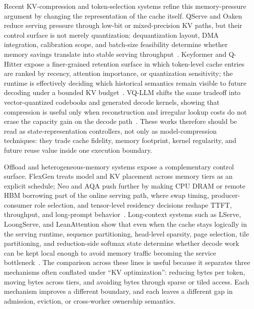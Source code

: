 \documentclass[acmsmall,screen,review]{acmart}
\begin{document}
Recent KV-compression and token-selection systems refine this memory-pressure argument by changing the representation of the cache itself. QServe and Oaken reduce serving pressure through low-bit or mixed-precision KV paths, but their control surface is not merely quantization: dequantization layout, DMA integration, calibration scope, and batch-size feasibility determine whether memory savings translate into stable serving throughput~\cite{lin2025qserve,kim2025oaken}. Keyformer and Q-Hitter expose a finer-grained retention surface in which token-level cache entries are ranked by recency, attention importance, or quantization sensitivity; the runtime is effectively deciding which historical semantics remain visible to future decoding under a bounded KV budget~\cite{adnan2024keyformer,dong2024qhitter}. VQ-LLM shifts the same tradeoff into vector-quantized codebooks and generated decode kernels, showing that compression is useful only when reconstruction and irregular lookup costs do not erase the capacity gain on the decode path~\cite{liu2025vqllm}. These works therefore should be read as state-representation controllers, not only as model-compression techniques: they trade cache fidelity, memory footprint, kernel regularity, and future reuse value inside one execution boundary.

Offload and heterogeneous-memory systems expose a complementary control surface. FlexGen treats model and KV placement across memory tiers as an explicit schedule; Neo and AQA push further by making CPU DRAM or remote HBM borrowing part of the online serving path, where swap timing, producer-consumer role selection, and tensor-level residency decisions reshape TTFT, throughput, and long-prompt behavior~\cite{sheng2023flexgen,jiang2025neo,kumar2025aqa}. Long-context systems such as LServe, LoongServe, and LeanAttention show that even when the cache stays logically in the serving runtime, sequence partitioning, head-level sparsity, page selection, tile partitioning, and reduction-side softmax state determine whether decode work can be kept local enough to avoid memory traffic becoming the service bottleneck~\cite{yang2025lserve,loongserve2024,sanovar2024leanattention}. The comparison across these lines is useful because it separates three mechanisms often conflated under ``KV optimization'': reducing bytes per token, moving bytes across tiers, and avoiding bytes through sparse or tiled access. Each mechanism improves a different boundary, and each leaves a different gap in admission, eviction, or cross-worker ownership semantics.
\end{document}
